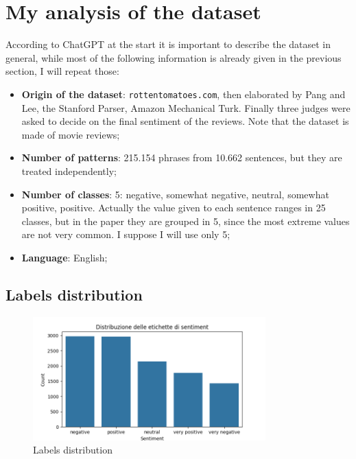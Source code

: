 \section{My analysis of the dataset}

According to ChatGPT at the start it is important to describe the dataset in
general, while most of the following information is already given in the
previous section, I will repeat those:
\begin{itemize}
	\item \textbf{Origin of the dataset}: \texttt{rottentomatoes.com}, then
		elaborated by Pang and Lee, the Stanford Parser, Amazon Mechanical Turk.
		Finally three judges were asked to decide on the final sentiment of the
		reviews. Note that the dataset is made of movie reviews;

	\item \textbf{Number of patterns}: 215.154 phrases from 10.662 sentences,
		but they are treated independently;

	\item \textbf{Number of classes}: 5: negative, somewhat negative, neutral,
		somewhat positive, positive. Actually the value given to each sentence
		ranges in 25 classes, but in the paper they are grouped in 5, since the
		most extreme values are not very common. I suppose I will use only 5;

	\item \textbf{Language}: English;
\end{itemize}

\subsection{Labels distribution}

\begin{figure}[H]
	\centering
	\includegraphics[width=0.8\textwidth]{figures/label_distribution.png}
	\caption{Labels distribution}
	\label{fig:labels_distribution}
\end{figure}

